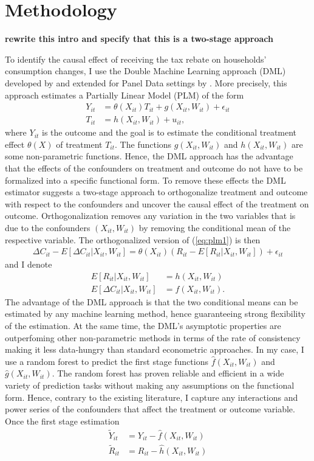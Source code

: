 \section*{Methodology}
\textbf{rewrite this intro and specify that this is a two-stage approach}

To identify the causal effect of receiving the tax rebate on households' consumption changes, I use the Double Machine Learning approach (DML) developed by \cite{DML2017} and extended for Panel Data settings by \cite{PanelDML}. More precisely, this approach estimates a Partially Linear Model (PLM) of the form
\begin{align}
    Y_{it}&=\theta(X_{it})T_{it}+g(X_{it}, W_{it})+\epsilon_{it} \label{eq:plm1}\\
    T_{it}&=h(X_{it}, W_{it})+u_{it}, \label{eq:plm2}
\end{align}
where $Y_{it}$ is the outcome and the goal is to estimate the conditional treatment effect $\theta(X)$ of treatment $T_{it}$. The functions $g(X_{it}, W_{it})$ and $h(X_{it}, W_{it})$ are some non-parametric functions. Hence, the DML approach has the advantage that the effects of the confounders on treatment and outcome do not have to be formalized into a specific functional form. To remove these effects the DML estimator suggests a two-stage approach to orthogonalize treatment and outcome with respect to the confounders and uncover the causal effect of the treatment on outcome. Orthogonalization removes any variation in the two variables that is due to the confounders $(X_{it}, W_{it})$ by removing the conditional mean of the respective variable. The orthogonalized version of (\ref{eq:plm1}) is then
\begin{align}
    \Delta C_{it}-E[\Delta C_{it}|X_{it}, W_{it}]=\theta(X_{it})(R_{it}-E[R_{it}|X_{it}, W_{it}])+\epsilon_{it}
\end{align}
and I denote
\begin{align}
    E[R_{it}|X_{it}, W_{it}]&=h(X_{it}, W_{it}) \\
    E[\Delta C_{it}|X_{it}, W_{it}]&=f(X_{it}, W_{it}).
\end{align}
The advantage of the DML approach is that the two conditional means can be estimated by any machine learning method, hence guaranteeing strong flexibility of the estimation. At the same time, the DML's asymptotic properties are outperfoming other non-parametric methods in terms of the rate of consistency making it less data-hungry than standard econometric approaches. In my case, I use a random forest to predict the first stage functions $\hat{f}(X_{it}, W_{it})$ and $\hat{g}(X_{it}, W_{it})$. The random forest has proven reliable and efficient in a wide variety of prediction tasks without making any assumptions on the functional form. Hence, contrary to the existing literature, I capture any interactions and power series of the confounders that affect the treatment or outcome variable. \\ 
Once the first stage estimation 
\begin{align}
    \tilde{Y}_{it}&=Y_{it}-\hat{f}(X_{it}, W_{it})\\
    \tilde{R}_{it}&=R_{it}-\hat{h}(X_{it}, W_{it})
\end{align}

